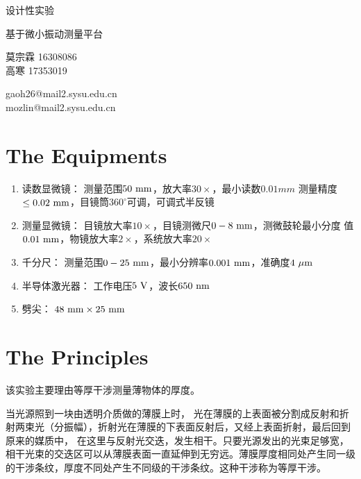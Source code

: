 \documentclass[CJK]{beamer}
\author{}
\date{}
\begin{document}
\begin{frame}
 
\begin{center}
\bch
\begin{Large}
设计性实验

\skipline
基于微小振动测量平台



\end{Large}
\skipline
莫宗霖   16308086 \\
高寒     17353019


gaoh26@mail2.sysu.edu.cn \\
mozlin@mail2.sysu.edu.cn
\ech
\end{center}
\end{frame}


\section{The Equipments}

\begin{frame}
\bch
\begin{enumerate}
\item 读数显微镜：     测量范围$50{\rm \ mm}$，放大率$30\times$，最小读数$0.01mm$
                        测量精度$\leq0.02{\rm \ mm}$，目镜筒$360^\circ$可调，可调式半反镜
\item 测量显微镜：     目镜放大率$10\times$，目镜测微尺$0-8{\rm \ mm}$，测微鼓轮最小分度
                        值$0.01{\rm \ mm}$，物镜放大率$2\times$，系统放大率$20\times$
\item 千分尺：        测量范围$0-25{\rm \ mm}$，最小分辨率$0.001{\rm \ mm}$，准确度$4{\rm \ \mu m}$
\item 半导体激光器：  工作电压$5{\rm \ V}$，波长$650{\rm \ nm}$
\item 劈尖：         $48{\rm \ mm}\times25{\rm \ mm}$
\end{enumerate}
\ech
\end{frame}

\section{The Principles}
\begin{frame}
\bch
该实验主要理由等厚干涉测量薄物体的厚度。\par
当光源照到一块由透明介质做的薄膜上时， 光在薄膜的上表面被分割成反射和折射两束光（分振幅），折射光在薄膜的下表面反射后，又经上表面折射，最后回到原来的媒质中， 在这里与反射光交迭，发生相干。只要光源发出的光束足够宽，相干光束的交迭区可以从薄膜表面一直延伸到无穷远。薄膜厚度相同处产生同一级的干涉条纹，厚度不同处产生不同级的干涉条纹。这种干涉称为等厚干涉。
\ech
\end{frame}
\end{document}
